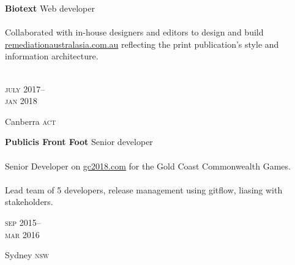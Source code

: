 \begin{minipage}[t]{\mainboxwidth\textwidth}
\textbf{Biotext}\phantom{..} Web developer\\
\\
{\small
Collaborated with in-house designers and editors to design and build 
\href{https://www.remediationaustralasia.com.au/}{remediationaustralasia.com.au} 
reflecting the print publication's style and information architecture.
}
\\
\\
{\small
\par}
\end{minipage}
\begin{minipage}[t]{\detailboxwidth\textwidth}
{
\hfill \textsc{july} 2017--\\ 
\hspace*{0pt} \hfill \textsc{jan} 2018
\par
{\small\hfill Canberra \textsc{act}}
}
\end{minipage}

\begin{minipage}[t]{\mainboxwidth\textwidth}
\textbf{Publicis Front Foot}\phantom{..} Senior developer \\
\\
{\small
Senior Developer on \href{https://www.gc2018.com/}{gc2018.com} 
for the Gold Coast Commonwealth Games.
\\
\\
Lead team of 5 developers, release management using
gitflow, liasing with stakeholders.}
\\
{\small
\textit{}
\par}
\end{minipage}
\begin{minipage}[t]{\detailboxwidth\textwidth}
{
\hfill \textsc{sep} 2015--\\ 
\hspace*{0pt} \hfill \textsc{mar} 2016
\par
{\small\hfill Sydney \textsc{nsw}}
}
\end{minipage}
\\




